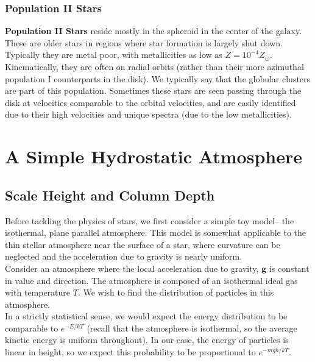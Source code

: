 \documentclass[10pt]{article}
\numberwithin{equation}{section}
\newcommand{\n}{\noindent}
\begin{document}
	\subsubsection{Population II Stars}
	 \textbf{Population II Stars} reside mostly in the spheroid in the 
center of the galaxy. These are older stars in regions where star formation 
is largely shut down. Typically they are metal poor, with metallicities as 
low as $Z=10^{-4}Z_\odot$. Kinematically, they are often on radial orbits 
(rather than their more azimuthal population I counterparts in the disk). 
We typically say that the globular clusters are part of this population. 
Sometimes these stars are seen passing through the disk at velocities 
comparable to the orbital velocities, and are easily identified due to 
their high velocities and unique spectra (due to the low metallicities).


\section{A Simple Hydrostatic Atmosphere}
	 \subsection{Scale Height and Column Depth}
	 Before tackling the physics of stars, we first consider a simple toy 
model-- the isothermal, plane parallel atmosphere. This model is somewhat 
applicable to the thin stellar atmosphere near the surface of a star, where 
curvature can be neglected and the acceleration due to gravity is nearly 
uniform.\\
	 
	 \n Consider an atmosphere where the local acceleration due to gravity, 
$\mathbf{g}$ is constant in value and direction. The atmosphere is composed 
of an isothermal ideal gas with temperature $T$. We wish to find the 
distribution of particles in this atmosphere.\\
	 
	 \n In a strictly statistical sense, we would expect the energy 
distribution to be comparable to $e^{-E/kT}$ (recall that the atmosphere is 
isothermal, so the average kinetic energy is uniform throughout). In our 
case, the energy of particles is linear in height, so we expect this 
probability to be proportional to $e^{-mgh/kT}$.\\
	 
\end{document}
